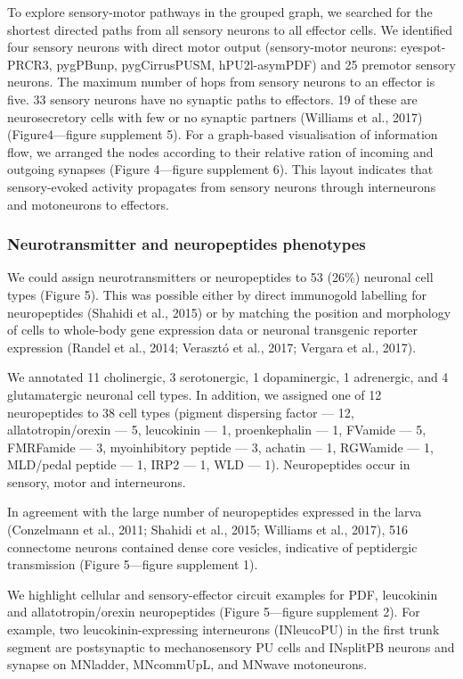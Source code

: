 \documentclass[
  11pt,
]{article}
\begin{document}
To explore sensory-motor pathways in the grouped graph, we searched for
the shortest directed paths from all sensory neurons to all effector
cells. We identified four sensory neurons with direct motor output
(sensory-motor neurons: eyespot-PRCR3, pygPBunp, pygCirrusPUSM,
hPU2l-asymPDF) and 25 premotor sensory neurons. The maximum number of
hops from sensory neurons to an effector is five. 33 sensory neurons
have no synaptic paths to effectors. 19 of these are neurosecretory
cells with few or no synaptic partners (Williams et al., 2017)
(Figure4---figure supplement 5). For a graph-based visualisation of
information flow, we arranged the nodes according to their relative
ration of incoming and outgoing synapses (Figure 4---figure supplement
6). This layout indicates that sensory-evoked activity propagates from
sensory neurons through interneurons and motoneurons to effectors.

\subsubsection{Neurotransmitter and neuropeptides
phenotypes}\label{neurotransmitter-and-neuropeptides-phenotypes}

We could assign neurotransmitters or neuropeptides to 53 (26\%) neuronal
cell types (Figure 5). This was possible either by direct immunogold
labelling for neuropeptides (Shahidi et al., 2015) or by matching the
position and morphology of cells to whole-body gene expression data or
neuronal transgenic reporter expression (Randel et al., 2014; Verasztó
et al., 2017; Vergara et al., 2017).

We annotated 11 cholinergic, 3 serotonergic, 1 dopaminergic, 1
adrenergic, and 4 glutamatergic neuronal cell types. In addition, we
assigned one of 12 neuropeptides to 38 cell types (pigment dispersing
factor --- 12, allatotropin/orexin --- 5, leucokinin --- 1,
proenkephalin --- 1, FVamide --- 5, FMRFamide --- 3, myoinhibitory
peptide --- 3, achatin --- 1, RGWamide --- 1, MLD/pedal peptide --- 1,
IRP2 --- 1, WLD --- 1). Neuropeptides occur in sensory, motor and
interneurons.

In agreement with the large number of neuropeptides expressed in the
larva (Conzelmann et al., 2011; Shahidi et al., 2015; Williams et al.,
2017), 516 connectome neurons contained dense core vesicles, indicative
of peptidergic transmission (Figure 5---figure supplement 1).

We highlight cellular and sensory-effector circuit examples for PDF,
leucokinin and allatotropin/orexin neuropeptides (Figure 5---figure
supplement 2). For example, two leucokinin-expressing interneurons
(INleucoPU) in the first trunk segment are postsynaptic to
mechanosensory PU cells and INsplitPB neurons and synapse on MNladder,
MNcommUpL, and MNwave motoneurons.
\end{document}
